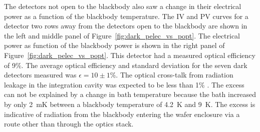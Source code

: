 
The detectors not open to the blackbody also saw a change in their electrical power as a function of the blackbody temperature. 
The IV and PV curves for a detector two rows away from the detectors open to the blackbody are shown in the left and middle panel of Figure~\ref{fig:dark_pelec_vs_popt}. 
The electrical power as function of the blackbody power is shown in the right panel of Figure~\ref{fig:dark_pelec_vs_popt}. 
This detector had a measured optical efficiency of 9\%. 
The average optical efficiency and standard deviation for the seven dark detectors measured was $\epsilon=10\pm1\%$. 
The optical cross-talk from radiation leakage in the integration cavity was expected to be less than 1\% \cite{Dobbs2011}.
The excess can not be explained by a change in bath temperature because the bath increased by only 2~mK between a blackbody temperature of 4.2~K and 9~K. 
The excess is indicative of radiation from the blackbody entering the wafer enclosure via a route other than through the optics stack.

